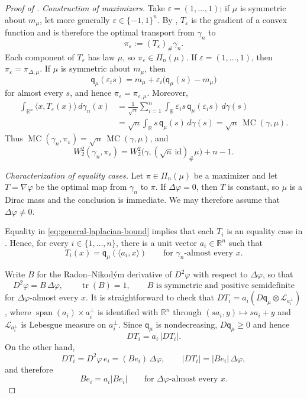 \documentclass[11pt]{amsart}
\theoremstyle{definition}
\newcommand{\R}{\mathbb{R}}
\newcommand{\W}{W}
\newcommand{\qmu}{\mathsf q_{\mu}}
\newcommand{\MC}{\operatorname{MC}}
\begin{document}
\begin{proof}[Proof of ]
\noindent\emph{Construction of maximizers.}
Take $\varepsilon=(1,\ldots,1)$; if $\mu$ is symmetric about
$m_\mu$, let more generally $\varepsilon\in\{-1,1\}^n$. By
, $T_\varepsilon$ is the gradient of a
convex function and is therefore the optimal transport from
$\gamma_n$ to
\[
  \pi_\varepsilon:=(T_\varepsilon)_\#\gamma_n.
\]
Each component of $T_\varepsilon$ has law $\mu$, so
$\pi_\varepsilon\in\Pi_n(\mu)$. If
$\varepsilon=(1,\ldots,1)$, then $\pi_\varepsilon=\pi_{\Delta,\mu}$.
If $\mu$ is symmetric about $m_\mu$, then
\[
  \qmu(\varepsilon_i s)
  =
  m_\mu+\varepsilon_i\bigl(\qmu(s)-m_\mu\bigr)
\]
for almost every $s$, and hence
$\pi_\varepsilon=\pi_{\varepsilon,\mu}$. Moreover,
\begin{align*}
  \int_{\R^n}
  \langle x,T_\varepsilon(x)\rangle\,d\gamma_n(x)
  &=
  \frac1{\sqrt n}\sum_{i=1}^n
  \int_\R \varepsilon_i s\,\qmu(\varepsilon_i s)\,d\gamma(s)\\
  &=
  \sqrt n\int_\R s\,\qmu(s)\,d\gamma(s)
  =
  \sqrt n\,\MC(\gamma,\mu).
\end{align*}
Thus $\MC(\gamma_n,\pi_\varepsilon)
=\sqrt n\,\MC(\gamma,\mu)$, and
\[
  \W_2^2(\gamma_n,\pi_\varepsilon)
  =
  \W_2^2\bigl(\gamma,(\sqrt n\,\mathrm{id})_\#\mu\bigr)+n-1.
\]

\medskip
\noindent\emph{Characterization of equality cases.}
Let $\pi\in\Pi_n(\mu)$ be a maximizer and let $T=\nabla\varphi$
be the optimal map from $\gamma_n$ to $\pi$. If
$\Delta\varphi=0$, then $T$ is constant, so $\mu$ is a Dirac mass
and the conclusion is immediate. We may therefore assume that
$\Delta\varphi\neq0$.

Equality in \eqref{eq:general-laplacian-bound} implies that each
$T_i$ is an equality case in . Hence, for
every $i\in\{1,\ldots,n\}$, there is a unit vector $a_i\in\R^n$
such that
\begin{equation}\label{eq:equality-components}
  T_i(x)=\qmu(\langle a_i,x\rangle)
  \qquad\text{for $\gamma_n$-almost every }x.
\end{equation}

Write $B$ for the Radon--Nikodým derivative of $D^2\varphi$ with
respect to $\Delta\varphi$, so that
\[
  D^2\varphi=B\,\Delta\varphi,
  \qquad
  \operatorname{tr}(B)=1,
  \qquad
  B\text{ is symmetric and positive semidefinite}
\]
for $\Delta\varphi$-almost every $x$. It is straightforward to check that $DT_i = a_i ( D\qmu \otimes \mathcal{L}_{a_i^\bot})$, where $\operatorname{span}(a_i)\times a_i^\bot$ is identified with $\R^n$ through $(s a_i,y)\mapsto s a_i+y$ and $\mathcal{L}_{a_i^\bot}$ is Lebesgue measure on $a_i^\bot$. Since $\qmu$ is nondecreasing, $D \qmu \ge 0$ and hence
\[
  DT_i=a_i\,|DT_i|.
\]
On the other hand,
\[
  DT_i=D^2\varphi\,e_i=(Be_i)\,\Delta\varphi,
  \qquad
  |DT_i|=|Be_i|\,\Delta\varphi,
\]
and therefore
\begin{equation}\label{eq:prf:B_struc}
  Be_i=a_i|Be_i|
  \qquad\text{for $\Delta\varphi$-almost every }x.
\end{equation}


\end{proof}
\end{document}
